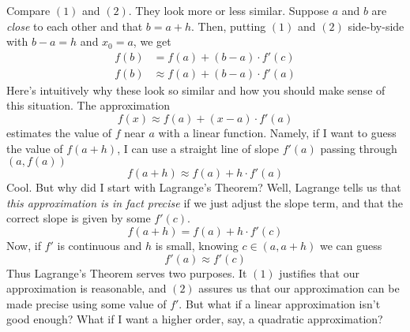 Compare $(1)$ and $(2)$. They look more or less similar. Suppose $a$ and $b$ are \emph{close} to each other and that $b = a + h$. Then, putting $(1)$ and $(2)$ side-by-side with $b - a = h$ and $x_0 = a$, we get
\begin{align*}
f(b) &= f(a) + (b - a)\cdot f'(c)\\
f(b) &\approx f(a) + (b - a)\cdot f'(a)
\end{align*}
Here's intuitively why these look so similar and how you should make sense of this situation. The approximation
$$
f(x) \approx f(a) + (x - a)\cdot f'(a)
$$
estimates the value of $f$ near $a$ with a linear function. Namely, if I want to guess the value of $f(a + h)$, I can use a straight line of slope $f'(a)$ passing through $(a, f(a))$
$$
f(a + h) \approx f(a) + h\cdot f'(a)
$$
Cool. But why did I start with Lagrange's Theorem? Well, Lagrange tells us that \emph{this approximation is in fact precise} if we just adjust the slope term, and that the correct slope is given by some $f'(c)$.
$$
f(a + h) = f(a) + h\cdot f'(c)
$$
Now, if $f'$ is continuous and $h$ is small, knowing $c \in (a, a + h)$ we can guess
$$
f'(a) \approx f'(c)
$$
Thus Lagrange's Theorem serves two purposes. It $(1)$ justifies that our approximation is reasonable, and $(2)$ assures us that our approximation can be made precise using some value of $f'$.
\newpage
But what if a linear approximation isn't good enough? What if I want a higher order, say, a quadratic approximation?
